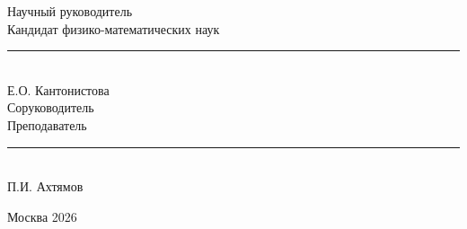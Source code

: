 \begin{titlepage}
{\hfill
\begin{minipage}[t]{0.5\textwidth}
\raggedleft
Научный руководитель\\
Кандидат физико-математических наук\\[1em]
\rule{5cm}{0.4pt}\\
Е.О. Кантонистова\\[1.25em]

Соруководитель\\
Преподаватель\\[1em]
\rule{5cm}{0.4pt}\\
П.И. Ахтямов
\end{minipage}

\vspace{2em}

\begin{center}
Москва 2026
\end{center}

}
\end{titlepage}
